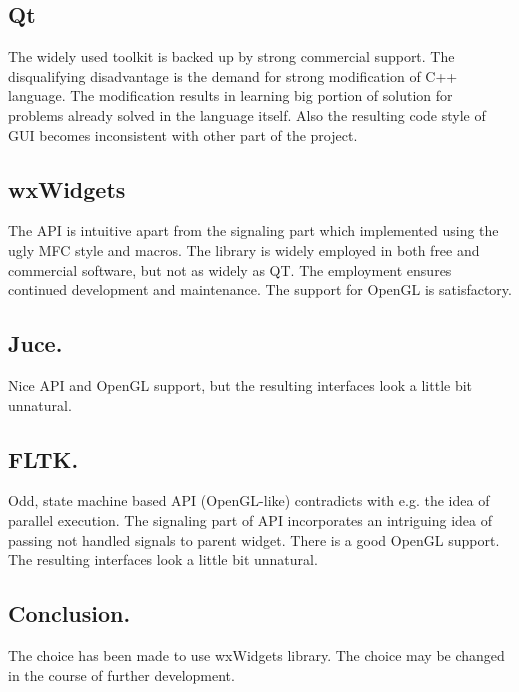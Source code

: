 \subsection{Qt}

The widely used toolkit is backed up by strong commercial support. The disqualifying disadvantage is the demand for strong modification of C++ language. The modification results in learning big portion of solution for problems already solved in the language itself. Also the resulting code style of GUI becomes inconsistent with other part of the project.

\subsection{wxWidgets}

The API is intuitive apart from the signaling part which implemented using the ugly MFC style and macros. The library is widely employed in both free and commercial software, but not as widely as QT. The employment ensures continued development and maintenance. The support for OpenGL is satisfactory.

\subsection{Juce.}
Nice API and OpenGL support, but the resulting interfaces look a little bit unnatural.

\subsection{FLTK.}
Odd, state machine based API (OpenGL-like) contradicts with e.g. the idea of parallel execution. The signaling part of API incorporates an intriguing idea of passing not handled signals to parent widget. There is a good OpenGL support. The resulting interfaces look a little bit unnatural.

\subsection{Conclusion.}
The choice has been made to use wxWidgets library. The choice may be changed in the course of further development.





